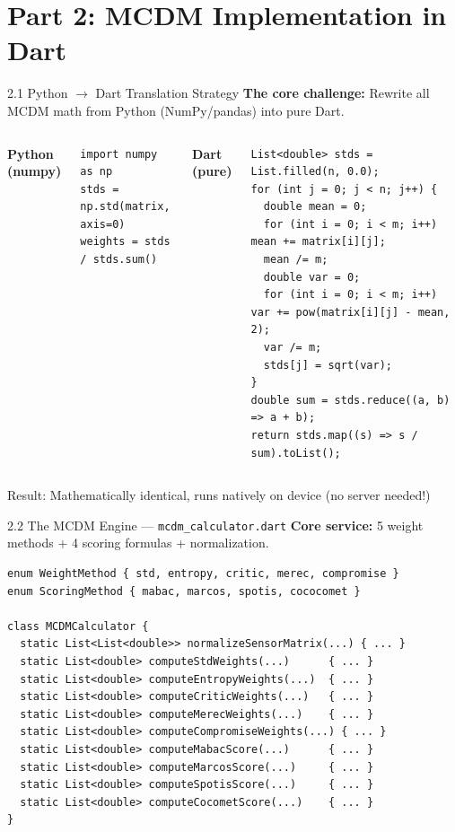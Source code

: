 \documentclass[aspectratio=169]{beamer}
\begin{document}
\section{Part 2: MCDM Implementation in Dart}

\begin{frame}{2.1 Python $\rightarrow$ Dart Translation Strategy}
  \textbf{The core challenge:} Rewrite all MCDM math from Python (NumPy/pandas) into pure Dart.

  \vspace{0.3cm}
  \begin{columns}
    \textbf{Python (numpy)}
    \begin{lstlisting}[style=pythonstyle]
import numpy as np
stds = np.std(matrix, axis=0)
weights = stds / stds.sum()
    \end{lstlisting}

    \textbf{Dart (pure)}
    \begin{lstlisting}[style=dartstyle]
List<double> stds = List.filled(n, 0.0);
for (int j = 0; j < n; j++) {
  double mean = 0;
  for (int i = 0; i < m; i++) mean += matrix[i][j];
  mean /= m;
  double var = 0;
  for (int i = 0; i < m; i++) var += pow(matrix[i][j] - mean, 2);
  var /= m;
  stds[j] = sqrt(var);
}
double sum = stds.reduce((a, b) => a + b);
return stds.map((s) => s / sum).toList();
    \end{lstlisting}
  \end{columns}

  \vspace{0.3cm}
  \centering
  \alert{Result:} Mathematically identical, runs natively on device (no server needed!)
\end{frame}

\begin{frame}{2.2 The MCDM Engine --- \texttt{mcdm\_calculator.dart}}
  \textbf{Core service:} 5 weight methods + 4 scoring formulas + normalization.

  \vspace{0.1cm}
  \begin{lstlisting}[style=dartstyle,basicstyle=\ttfamily\footnotesize]
enum WeightMethod { std, entropy, critic, merec, compromise }
enum ScoringMethod { mabac, marcos, spotis, cococomet }

class MCDMCalculator {
  static List<List<double>> normalizeSensorMatrix(...) { ... }
  static List<double> computeStdWeights(...)      { ... }
  static List<double> computeEntropyWeights(...)  { ... }
  static List<double> computeCriticWeights(...)   { ... }
  static List<double> computeMerecWeights(...)    { ... }
  static List<double> computeCompromiseWeights(...) { ... }
  static List<double> computeMabacScore(...)      { ... }
  static List<double> computeMarcosScore(...)     { ... }
  static List<double> computeSpotisScore(...)     { ... }
  static List<double> computeCocometScore(...)    { ... }
}
  \end{lstlisting}
\end{frame}
\end{document}
